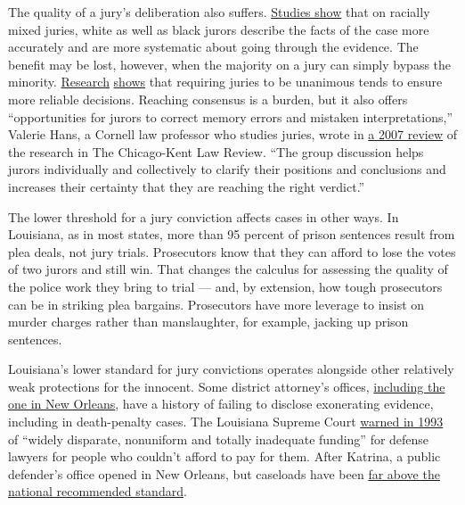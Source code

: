The quality of a jury's deliberation also suffers.
\href{https://www.ucl.ac.uk/human-resources/sites/human-resources/files/sommers_2006_-_identifying_multiple_effects_of_racial_composition_on_jury_deliberations.pdf}{Studies
show} that on racially mixed juries, white as well as black jurors
describe the facts of the case more accurately and are more systematic
about going through the evidence. The benefit may be lost, however, when
the majority on a jury can simply bypass the minority.
\href{https://global.oup.com/academic/product/the-jury-under-fire-9780190201340?cc=us\&lang=en\&}{Research}
\href{https://espace.library.uq.edu.au/view/UQ:335118}{shows} that
requiring juries to be unanimous tends to ensure more reliable
decisions. Reaching consensus is a burden, but it also offers
``opportunities for jurors to correct memory errors and mistaken
interpretations,'' Valerie Hans, a Cornell law professor who studies
juries, wrote in
\href{https://scholarship.law.cornell.edu/cgi/viewcontent.cgi?article=1381\&context=facpub}{a
2007 review} of the research in The Chicago-Kent Law Review. ``The group
discussion helps jurors individually and collectively to clarify their
positions and conclusions and increases their certainty that they are
reaching the right verdict.''

The lower threshold for a jury conviction affects cases in other ways.
In Louisiana, as in most states, more than 95 percent of prison
sentences result from plea deals, not jury trials. Prosecutors know that
they can afford to lose the votes of two jurors and still win. That
changes the calculus for assessing the quality of the police work they
bring to trial --- and, by extension, how tough prosecutors can be in
striking plea bargains. Prosecutors have more leverage to insist on
murder charges rather than manslaughter, for example, jacking up prison
sentences.

Louisiana's lower standard for jury convictions operates alongside other
relatively weak protections for the innocent. Some district attorney's
offices,
\href{https://www.washingtonpost.com/news/the-watch/wp/2015/10/27/new-orleanss-persistent-prosecutor-problem/}{including
the one in New Orleans}, have a history of failing to disclose
exonerating evidence, including in death-penalty cases. The Louisiana
Supreme Court
\href{https://www.courtlistener.com/opinion/1677614/state-v-peart/}{warned
in 1993} of ``widely disparate, nonuniform and totally inadequate
funding'' for defense lawyers for people who couldn't afford to pay for
them. After Katrina, a public defender's office opened in New Orleans,
but caseloads have been
\href{https://www.nytimes3xbfgragh.onion/2016/02/19/opinion/when-the-public-defender-says-i-cant-help.html}{far
above the national recommended standard}.

